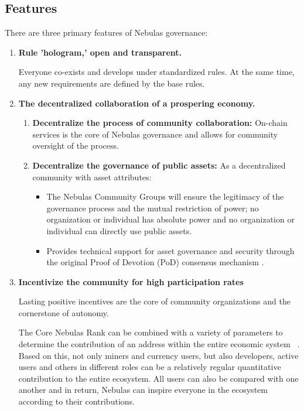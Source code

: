\subsection{Features}

There are three primary features of Nebulas governance:

\begin{enumerate}
	\item 

	\textbf{Rule 'hologram,' open and transparent.} 

	Everyone co-exists and develops under standardized rules. At the same time, any new requirements are defined by the base rules.

	\item 

	\textbf{The decentralized collaboration of a prospering economy.}

	\begin{enumerate}
		\item 

		\textbf{Decentralize the process of community collaboration:} On-chain services is the core of Nebulas governance and allows for community oversight of the process.
		
		\item 

		\textbf{Decentralize the governance of public assets:} As a decentralized community with asset attributes:

		\begin{itemize}
			\item The Nebulas Community Groups will ensure the legitimacy of the governance process and the mutual restriction of power; no organization or individual has absolute power and no organization or individual can directly use public assets.
			\item Provides technical support for asset governance and security through the original Proof of Devotion (PoD) consensus mechanism .
		\end{itemize}

	\end{enumerate}

	\item 

	\textbf{Incentivize the community for high participation rates}
	
	Lasting positive incentives are the core of community organizations and the cornerstone of autonomy.

	The Core Nebulas Rank can be combined with a variety of parameters to determine the contribution of an address within the entire economic system ~\cite{yellowpaper}. Based on this, not only miners and currency users, but also developers, active users and others in different roles can be a relatively regular quantitative contribution to the entire ecosystem. All users can also be compared with one another and in return, Nebulas can inspire everyone in the ecosystem according to their contributions.


\end{enumerate}
